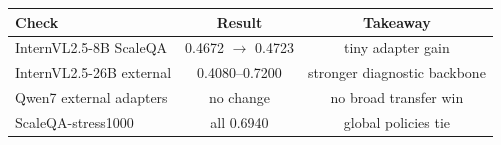 \begin{tabular}{lcc}
\toprule
Check & Result & Takeaway \\
\midrule
InternVL2.5-8B ScaleQA & 0.4672 $\rightarrow$ 0.4723 & tiny adapter gain \\
InternVL2.5-26B external & 0.4080--0.7200 & stronger diagnostic backbone \\
Qwen7 external adapters & no change & no broad transfer win \\
ScaleQA-stress1000 & all 0.6940 & global policies tie \\
\bottomrule
\end{tabular}
